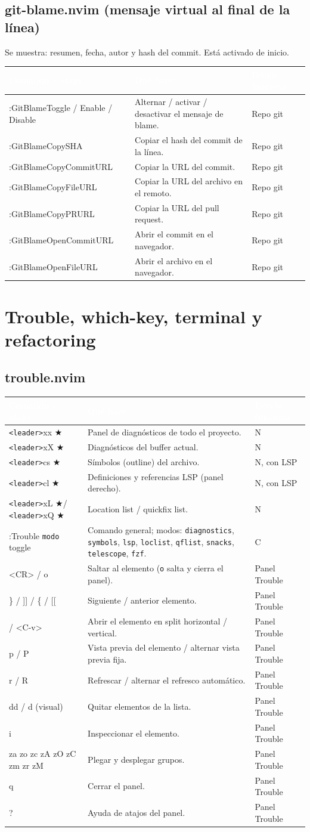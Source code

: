 \documentclass[8pt,a4paper,landscape]{extarticle}
\newcommand{\kk}[1]{\texttt{#1}}
\newcommand{\ld}{\texttt{<leader>}}
\newcommand{\mk}{\textcolor{mine}{$\bigstar$}}   %
\newenvironment{cht}{%
  \begin{longtable}{>{\raggedright\arraybackslash\ttfamily}p{0.27\textwidth}
                    >{\raggedright\arraybackslash}p{0.46\textwidth}
                    >{\raggedright\arraybackslash}p{0.21\textwidth}}
  \rowcolor{accent}\textcolor{white}{\textbf{\rmfamily Comando / atajo}} &
  \textcolor{white}{\textbf{Qué hace}} & \textcolor{white}{\textbf{Dónde funciona}} \\
  \endhead
}{\end{longtable}}
\newcommand{\rr}[3]{#1 & #2 & #3 \\}
\newcommand{\rg}[3]{\rowcolor{rowgray}\relax #1 & #2 & #3 \\}
\let\oldsubsection\subsection
\renewcommand{\subsection}{\Needspace{9\baselineskip}\oldsubsection}
\let\oldsection\section
\renewcommand{\section}{\Needspace{10\baselineskip}\oldsection}
\begin{document}
\subsection{git-blame.nvim (mensaje virtual al final de la línea)}
Se muestra: resumen, fecha, autor y hash del commit. Está activado de inicio.
\begin{cht}
\rg{:GitBlameToggle / Enable / Disable}{Alternar / activar / desactivar el mensaje de blame.}{Repo git}
\rr{:GitBlameCopySHA}{Copiar el hash del commit de la línea.}{Repo git}
\rg{:GitBlameCopyCommitURL}{Copiar la URL del commit.}{Repo git}
\rr{:GitBlameCopyFileURL}{Copiar la URL del archivo en el remoto.}{Repo git}
\rg{:GitBlameCopyPRURL}{Copiar la URL del pull request.}{Repo git}
\rr{:GitBlameOpenCommitURL}{Abrir el commit en el navegador.}{Repo git}
\rg{:GitBlameOpenFileURL}{Abrir el archivo en el navegador.}{Repo git}
\end{cht}

\section{Trouble, which-key, terminal y refactoring}

\subsection{trouble.nvim}
\begin{cht}
\rg{\ld xx \mk}{Panel de diagnósticos de todo el proyecto.}{N}
\rr{\ld xX \mk}{Diagnósticos del buffer actual.}{N}
\rg{\ld cs \mk}{Símbolos (outline) del archivo.}{N, con LSP}
\rr{\ld cl \mk}{Definiciones y referencias LSP (panel derecho).}{N, con LSP}
\rg{\ld xL \mk / \ld xQ \mk}{Location list / quickfix list.}{N}
\rr{:Trouble \kk{modo} toggle}{Comando general; modos: \kk{diagnostics}, \kk{symbols}, \kk{lsp}, \kk{loclist}, \kk{qflist}, \kk{snacks}, \kk{telescope}, \kk{fzf}.}{C}
\rg{<CR> / o}{Saltar al elemento (\kk{o} salta y cierra el panel).}{Panel Trouble}
\rr{\} / ]] / \{ / [[}{Siguiente / anterior elemento.}{Panel Trouble}
\rg{<C-s> / <C-v>}{Abrir el elemento en split horizontal / vertical.}{Panel Trouble}
\rr{p / P}{Vista previa del elemento / alternar vista previa fija.}{Panel Trouble}
\rg{r / R}{Refrescar / alternar el refresco automático.}{Panel Trouble}
\rr{dd / d (visual)}{Quitar elementos de la lista.}{Panel Trouble}
\rg{i}{Inspeccionar el elemento.}{Panel Trouble}
\rr{za zo zc zA zO zC zm zr zM}{Plegar y desplegar grupos.}{Panel Trouble}
\rg{q}{Cerrar el panel.}{Panel Trouble}
\rr{?}{Ayuda de atajos del panel.}{Panel Trouble}
\end{cht}
\end{document}
